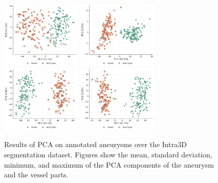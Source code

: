 \documentclass[%
 reprint,
 amsmath,amssymb,
 aps,
 floatfix,
 nofootinbib,
]{revtex4-2}
\begin{document}
\begin{figure}[h!]
  \centering
  \includegraphics[width=0.34\textwidth]{pca_global_mean.png}
  \includegraphics[width=0.34\textwidth]{pca_global_std.png}
  \includegraphics[width=0.34\textwidth]{pca_global_min.png}
  \includegraphics[width=0.34\textwidth]{pca_global_max.png}
  \caption{Results of PCA on annotated aneurysms over the Intra3D segmentation dataset. Figures show the mean, standard deviation, minimum, and maximum of the PCA components of the aneurysm and the vessel parts.}
  \label{fig:aneu_seg_supplementary}
\end{figure}
\end{document}

